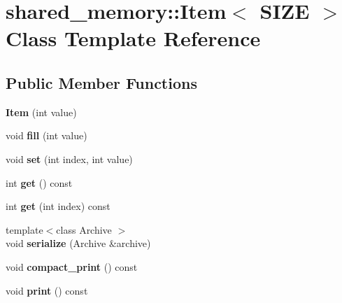 \hypertarget{classshared__memory_1_1Item}{}\section{shared\+\_\+memory\+:\+:Item$<$ S\+I\+ZE $>$ Class Template Reference}
\label{classshared__memory_1_1Item}
\subsection*{Public Member Functions}
\begin{DoxyCompactItemize}
\item 
\mbox{\label{classshared__memory_1_1Item_a6d7d4864fe09b43ec99356e9c0c62b98}} 
{\bfseries Item} (int value)
\item 
\mbox{\label{classshared__memory_1_1Item_a765ce924f63067b2df32f4170175611e}} 
void {\bfseries fill} (int value)
\item 
\mbox{\label{classshared__memory_1_1Item_a7941efea49faeb757864ae273604fd22}} 
void {\bfseries set} (int index, int value)
\item 
\mbox{\label{classshared__memory_1_1Item_a0ab0cd1f63406be588ba101c0aa228a1}} 
int {\bfseries get} () const
\item 
\mbox{\label{classshared__memory_1_1Item_a0d99d65ab40835e5ff73eec5866fd706}} 
int {\bfseries get} (int index) const
\item 
\mbox{\label{classshared__memory_1_1Item_ab48965377a911cf7b625926759b4e0f9}} 
{\footnotesize template$<$class Archive $>$ }\\void {\bfseries serialize} (Archive \&archive)
\item 
\mbox{\label{classshared__memory_1_1Item_a47908d76bd0cb02e6dcd8e18956f7bea}} 
void {\bfseries compact\+\_\+print} () const
\item 
\mbox{\label{classshared__memory_1_1Item_a6a78c1a546fb5e40e0b9d1d735d8095c}} 
void {\bfseries print} () const
\end{DoxyCompactItemize}
